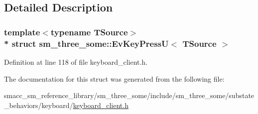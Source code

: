 \subsection{Detailed Description}
\subsubsection*{template$<$typename T\+Source$>$\\*
struct sm\+\_\+three\+\_\+some\+::\+Ev\+Key\+Press\+U$<$ T\+Source $>$}



Definition at line 118 of file keyboard\+\_\+client.\+h.



The documentation for this struct was generated from the following file\+:\begin{DoxyCompactItemize}
\item 
smacc\+\_\+sm\+\_\+reference\+\_\+library/sm\+\_\+three\+\_\+some/include/sm\+\_\+three\+\_\+some/substate\+\_\+behaviors/keyboard/\hyperlink{keyboard__client_8h}{keyboard\+\_\+client.\+h}\end{DoxyCompactItemize}
